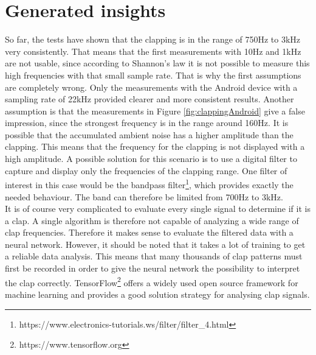 \section{Generated insights}
So far, the tests have shown that the clapping is in the range of 750Hz to 3kHz very consistently. That means that the first measurements with 10Hz and 1kHz are not usable, since according to Shannon's law it is not possible to measure this high frequencies with that small sample rate. That is why the first assumptions are completely wrong. Only the measurements with the Android device with a sampling rate of 22kHz provided clearer and more consistent results. Another assumption is that the measurements in Figure \ref{fig:clappingAndroid} give a false impression, since the strongest frequency is in the range around 160Hz. It is possible that the accumulated ambient noise has a higher amplitude than the clapping. This means that the frequency for the clapping is not displayed with a high amplitude. A possible solution for this scenario is to use a digital filter to capture and display only the frequencies of the clapping range. One filter of interest in this case would be the bandpass filter\footnote{https://www.electronics-tutorials.ws/filter/filter\_4.html}, which provides exactly the needed behaviour. The band can therefore be limited from 700Hz to 3kHz.
\\
It is of course very complicated to evaluate every single signal to determine if it is a clap. A single algorithm is therefore not capable of analyzing a wide range of clap frequencies. Therefore it makes sense to evaluate the filtered data with a neural network. However, it should be noted that it takes a lot of training to get a reliable data analysis. This means that many thousands of clap patterns must first be recorded in order to give the neural network the possibility to interpret the clap correctly. TensorFlow\footnote{https://www.tensorflow.org} offers a widely used open source framework for machine learning and provides a good solution strategy for analysing clap signals.